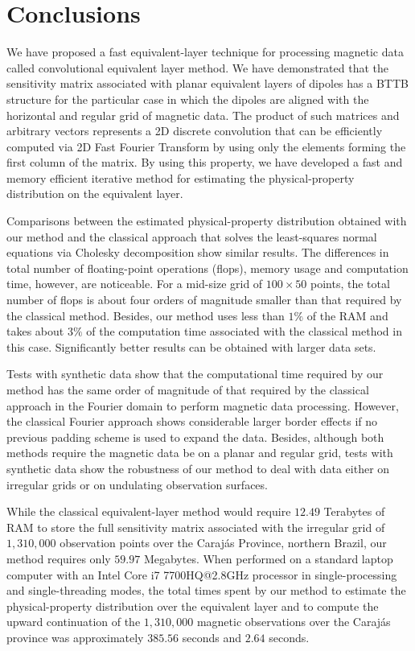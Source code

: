 \documentclass[manuscript]{geophysics}
\begin{document}
	\section{Conclusions}
	
	We have proposed a fast equivalent-layer technique for processing magnetic data called
	convolutional equivalent layer method.
	We have demonstrated that the sensitivity matrix associated with planar 
	equivalent layers of dipoles has a BTTB structure for the particular case in which 
	the dipoles are aligned with the horizontal and regular grid of magnetic data.
	The product of such matrices and arbitrary vectors represents a 2D discrete convolution
	that can be efficiently computed via 2D Fast Fourier Transform by using only the 
	elements forming the first column of the matrix.
	By using this property, we have developed a fast and memory efficient iterative method for 
	estimating the physical-property distribution on the equivalent layer.
	
	Comparisons between the estimated physical-property distribution obtained with our method and 
	the classical approach that solves the least-squares normal equations via Cholesky decomposition 
	show similar results. 
	The differences in total number of floating-point operations (flops), memory usage and computation 
	time, however, are noticeable. 
	For a mid-size grid of $100 \times 50$ points, the total number of flops is about four orders of
	magnitude smaller than that required by the classical method. Besides, our method uses
	less than $1\%$ of the RAM and takes about $3\%$ of the computation time associated with
	the classical method in this case.%
	Significantly better results can be obtained with larger data sets.
	
	Tests with synthetic data show that the computational time required by our method has 
	the same order of magnitude of that required by the classical approach in the Fourier domain
	to perform magnetic data processing.
	However, the classical Fourier approach shows considerable larger border effects if no previous 
	padding scheme is used to expand the data. 
	Besides, although both methods require the magnetic data be on a planar and regular grid, 
	tests with synthetic data show the robustness of our method to deal with data either on irregular grids
	or on undulating observation surfaces.
	
	While the classical equivalent-layer method would require $12.49$ Terabytes of RAM to store the full
	sensitivity matrix associated with the irregular grid of $1,310,000$ observation points over the
	Carajás Province, northern Brazil, our method requires only $59.97$ Megabytes.
	When performed on a standard laptop computer with an Intel Core i7 7700HQ@2.8GHz processor in
	single-processing and single-threading modes, the total times spent by our method to estimate the
	physical-property distribution over the equivalent layer and to compute the upward continuation
	of the $1,310,000$ magnetic observations over the Carajás province was approximately $385.56$ 
	seconds and $2.64$ seconds.
	
\end{document}

